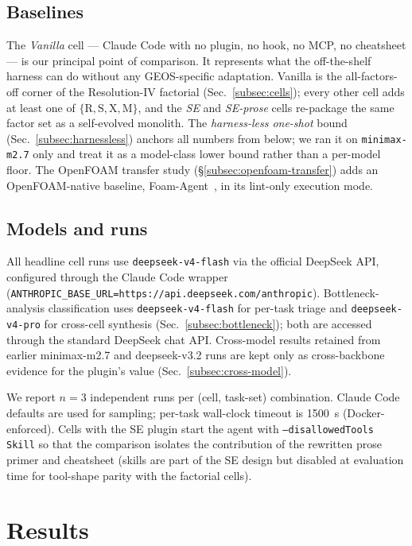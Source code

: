 \documentclass{article}
\begin{document}
\subsection{Baselines}
\label{subsec:baselines}
The \emph{Vanilla} cell --- Claude Code with no plugin, no hook, no MCP, no cheatsheet --- is our principal point of comparison. It represents what the off-the-shelf harness can do without any GEOS-specific adaptation. Vanilla is the all-factors-off corner of the Resolution-IV factorial (Sec.~\ref{subsec:cells}); every other cell adds at least one of $\{\mathrm{R, S, X, M}\}$, and the \emph{SE} and \emph{SE-prose} cells re-package the same factor set as a self-evolved monolith. The \emph{harness-less one-shot} bound (Sec.~\ref{subsec:harnessless}) anchors all numbers from below; we ran it on \texttt{minimax-m2.7} only and treat it as a model-class lower bound rather than a per-model floor. The OpenFOAM transfer study (\S\ref{subsec:openfoam-transfer}) adds an OpenFOAM-native baseline, Foam-Agent~\citep{foamagent2025}, in its lint-only execution mode.

\subsection{Models and runs}
All headline cell runs use \texttt{deepseek-v4-flash} via the official DeepSeek API, configured through the Claude Code wrapper (\texttt{ANTHROPIC\_BASE\_URL=https://api.deepseek.com/anthropic}). Bottleneck-analysis classification uses \texttt{deepseek-v4-flash} for per-task triage and \texttt{deepseek-v4-pro} for cross-cell synthesis (Sec.~\ref{subsec:bottleneck}); both are accessed through the standard DeepSeek chat API. Cross-model results retained from earlier minimax-m2.7 and deepseek-v3.2 runs are kept only as cross-backbone evidence for the plugin's value (Sec.~\ref{subsec:cross-model}).

We report $n=3$ independent runs per (cell, task-set) combination. Claude Code defaults are used for sampling; per-task wall-clock timeout is 1500~s (Docker-enforced). Cells with the SE plugin start the agent with \texttt{--disallowedTools Skill} so that the comparison isolates the contribution of the rewritten prose primer and cheatsheet (skills are part of the SE design but disabled at evaluation time for tool-shape parity with the factorial cells).


\section{Results}
\label{sec:results}
\end{document}
